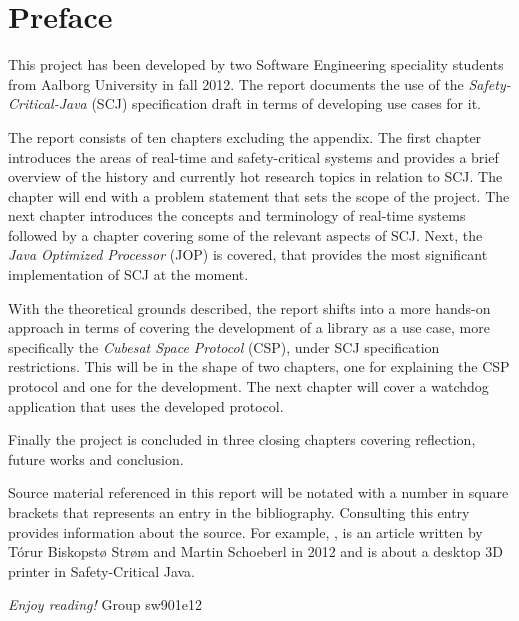 \newpage
\thispagestyle{empty}
\mbox{}

\chapter*{Preface}
This project has been developed by two Software Engineering speciality students from Aalborg University in fall 2012. The report documents the use of the \textit{Safety-Critical-Java} (SCJ) specification draft in terms of developing use cases for it.

\vspace{4mm}
\noindent The report consists of ten chapters excluding the appendix. The first chapter introduces the areas of real-time and safety-critical systems and provides a brief overview of the history and currently hot research topics in relation to SCJ. The chapter will end with a problem statement that sets the scope of the project. The next chapter introduces the concepts and terminology of real-time systems followed by a chapter covering some of the relevant aspects of SCJ. Next, the \textit{Java Optimized Processor} (JOP) is covered, that provides the most significant implementation of SCJ at the moment.

With the theoretical grounds described, the report shifts into a more hands-on approach in terms of covering the development of a library as a use case, more specifically the \textit{Cubesat Space Protocol} (CSP), under SCJ specification restrictions. This will be in the shape of two chapters, one for explaining the CSP protocol and one for the development. The next chapter will cover a watchdog application that uses the developed protocol.

Finally the project is concluded in three closing chapters covering reflection, future works and conclusion. 

\vspace{4mm}
\noindent Source material referenced in this report will be notated with a number in square brackets that represents an entry in the bibliography. Consulting this entry provides information about the source. For example, \cite{Schoeberl:2012:RepRap}, is an article written by T\'{o}rur Biskopst{\o} Str{\o}m and Martin Schoeberl in 2012 and is about a desktop 3D printer in Safety-Critical Java.

\vspace{5mm}
	\begin{flushright}
\emph{Enjoy reading!} Group sw901e12
	\end{flushright}

\newpage
